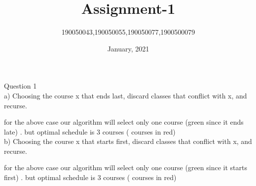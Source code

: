 \documentclass{extarticle}
\theoremstyle{remark}
\begin{document}
\title{Assignment-1}
\author{190050043,190050055,190050077,1900500079}
\date{January, 2021}
\maketitle
\thispagestyle{empty}
\clearpage
{}

\sffamily
\Large{Question 1}\\

\normalsize
a) Choosing the course x that ends last, discard classes that conflict with x,
and recurse.
\newline
\newline
\begin{center}

    
\end{center}
\vspace{0.2in}

for the above case our algorithm will select only one course (green since it ends late) . but optimal schedule is 3 courses ( courses in red)
\\



b) Choosing the course x that starts first, discard classes that conflict with x,
and recurse.
\newline
\newline
\begin{center}

    
\end{center}
\vspace{0.2in}
for the above case our algorithm will select only one course (green since it starts first) . but optimal schedule is 3 courses ( courses in red)
\\
\end{document}
